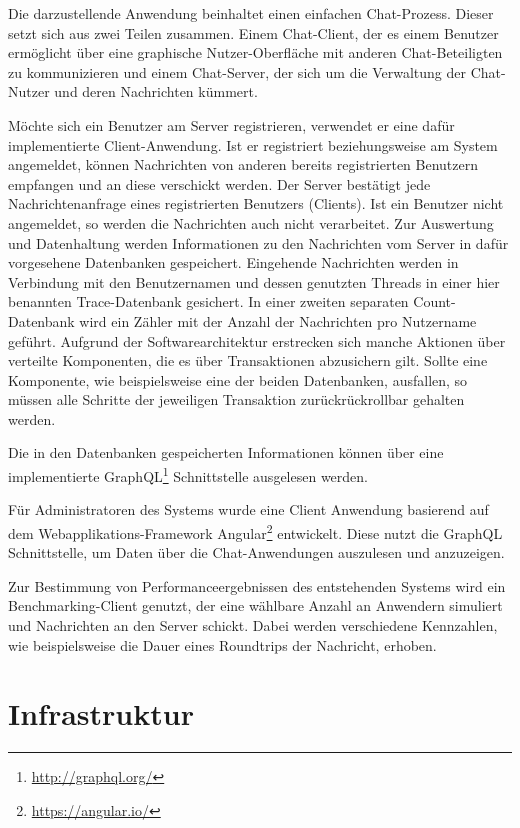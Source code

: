 \documentclass[10pt,journal,compsoc]{IEEEtran}
\begin{document}
Die darzustellende Anwendung beinhaltet einen einfachen Chat-Prozess. Dieser setzt sich aus zwei Teilen zusammen. Einem Chat-Client, der es einem Benutzer ermöglicht über eine graphische Nutzer-Oberfläche mit anderen Chat-Beteiligten zu kommunizieren und einem Chat-Server, der sich um die Verwaltung der Chat-Nutzer und deren Nachrichten kümmert. 

Möchte sich ein Benutzer am Server registrieren, verwendet er eine dafür implementierte Client-Anwendung. Ist er registriert beziehungsweise am System angemeldet, können Nachrichten von anderen bereits registrierten Benutzern empfangen und an diese verschickt werden. Der Server bestätigt jede Nachrichtenanfrage eines registrierten Benutzers (Clients). Ist ein Benutzer nicht angemeldet, so werden die Nachrichten auch nicht verarbeitet. Zur Auswertung und Datenhaltung werden Informationen zu den Nachrichten vom Server in dafür vorgesehene Datenbanken gespeichert. Eingehende Nachrichten werden in Verbindung mit den Benutzernamen und dessen genutzten Threads in einer hier benannten Trace-Datenbank gesichert. In einer zweiten separaten Count-Datenbank wird ein Zähler mit der Anzahl der Nachrichten pro Nutzername geführt. Aufgrund der Softwarearchitektur erstrecken sich manche Aktionen über verteilte Komponenten, die es über Transaktionen abzusichern gilt. Sollte eine Komponente, wie beispielsweise eine der beiden Datenbanken, ausfallen, so müssen alle Schritte der jeweiligen Transaktion zurückrückrollbar gehalten werden.

Die in den Datenbanken gespeicherten Informationen können über eine implementierte GraphQL\footnote{\url{http://graphql.org/}} Schnittstelle ausgelesen werden.

Für Administratoren des Systems wurde eine Client Anwendung basierend auf dem Webapplikations-Framework Angular\footnote{\url{https://angular.io/}} entwickelt. Diese nutzt die GraphQL Schnittstelle, um Daten über die Chat-Anwendungen auszulesen und anzuzeigen.

Zur Bestimmung von Performanceergebnissen des entstehenden Systems wird ein Benchmarking-Client genutzt, der eine wählbare Anzahl an Anwendern simuliert und Nachrichten an den Server schickt. Dabei werden verschiedene Kennzahlen, wie beispielsweise die Dauer eines Roundtrips der Nachricht, erhoben.

\section{Infrastruktur}
\end{document}
